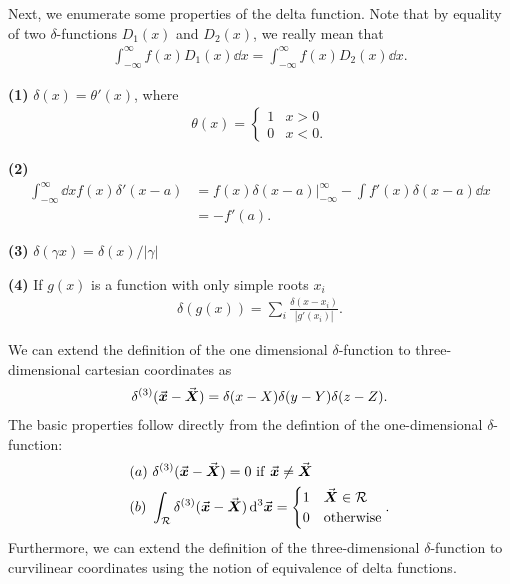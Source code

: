 Next, we enumerate some properties of the delta function.
Note that by equality of two $\delta$-functions $D_1(x)$ and $D_2(x)$, we really mean that
\begin{eqnarray}
    \int_{-\infty}^{\infty} f(x) D_{1}(x) \dd{x} = \int_{-\infty}^{\infty} f(x) D_{2}(x) \dd{x}
.\end{eqnarray}

\textbf{(1)} $\delta(x) = \theta'(x)$, where
\begin{align}
    \theta(x) = \begin{cases}
        1 & x > 0 \\
        0 & x < 0
    .\end{cases}
\end{align}

\textbf{(2)}
\begin{align}
    \int_{-\infty}^{\infty} \dd{x} f(x) \delta'(x - a) &= f(x) \delta(x - a) |_{-\infty}^{\infty} - \int f'(x) \delta(x - a) \dd{x} \nonumber \\
                                                       &= -f'(a)
.\end{align}

\textbf{(3)} $\delta(\gamma x) = \delta(x) / |\gamma|$

\textbf{(4)} If $g(x)$ is a function with only simple roots $x_{i}$
\begin{align}
    \delta(g(x)) = \sum_{i} \frac{\delta(x - x_{i})}{|g'(x_{i})|}
.\end{align}

We can extend the definition of the one dimensional $\delta$-function to three-dimensional cartesian coordinates as
\begin{align}
    \delta^{(3)}(\va*{x} - \va*{X}) = \delta(x - X) \delta(y - Y) \delta(z - Z)
.\end{align}
The basic properties follow directly from the defintion of the one-dimensional $\delta$-function:
\begin{align}
    &(a)~\delta^{(3)}(\va*{x} - \va*{X}) = 0~{\rm if}~\va*{x} \ne \va*{X} \\
    &(b)~\int_{\mathcal{R}} \delta^{(3)}(\va*{x} - \va*{X}) \dd[3]{\va*{x}} = \begin{cases}
        1 & \va*{X} \in \mathcal{R} \\
        0 & {\rm otherwise}
    \end{cases}
.\end{align}
Furthermore, we can extend the definition of the three-dimensional $\delta$-function to curvilinear coordinates using the notion of equivalence of delta functions.







